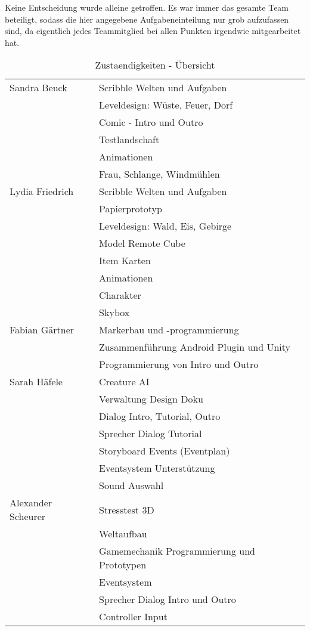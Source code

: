 
Keine Entscheidung wurde alleine getroffen. Es war immer das gesamte Team beteiligt, sodass die hier angegebene Aufgabeneinteilung nur grob aufzufassen sind, da eigentlich jedes Teammitglied bei allen Punkten irgendwie mitgearbeitet hat.

\begin{table}[!htbp] %
\begin{center}
\begin{tabular}[hc]{l|l}
\hline
Sandra Beuck & Scribble Welten und Aufgaben\\
& Leveldesign: Wüste, Feuer, Dorf\\
& Comic - Intro und Outro\\
& Testlandschaft\\
& Animationen\\
& Frau, Schlange, Windmühlen\\
\hline
Lydia Friedrich & Scribble Welten und Aufgaben\\
& Papierprototyp\\
& Leveldesign: Wald, Eis, Gebirge\\
& Model Remote Cube\\
& Item Karten\\
& Animationen\\
& Charakter\\
& Skybox\\
\hline
Fabian Gärtner & Markerbau und -programmierung\\
& Zusammenführung Android Plugin und Unity\\
& Programmierung von Intro und Outro\\
\hline
Sarah Häfele & Creature AI\\
& Verwaltung Design Doku\\
& Dialog Intro, Tutorial, Outro\\
& Sprecher Dialog Tutorial\\
& Storyboard Events (Eventplan)\\
& Eventsystem Unterstützung\\
& Sound Auswahl\\
\hline
Alexander Scheurer & Stresstest 3D\\
& Weltaufbau\\
& Gamemechanik Programmierung und Prototypen\\
& Eventsystem\\
& Sprecher Dialog Intro und Outro\\
& Controller Input\\
\end{tabular}
\caption{Zustaendigkeiten - Übersicht}
\label{tab:aufgaben}
\end{center}
\end{table}
